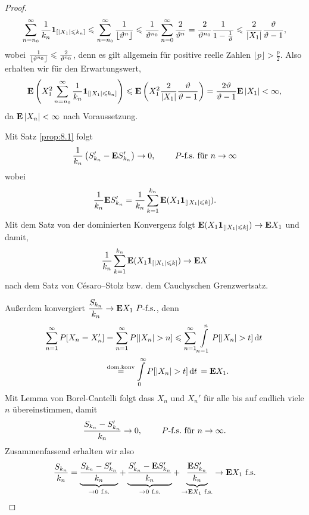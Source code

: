 \begin{proof}
\begin{align*}
\sum\limits_{n=n_0}^\infty \frac{1}{k_n}\mathbf{1}_{[\left|X_1\right|\leqslant k_n]}
\leqslant
\sum\limits_{n=n_0}^\infty \frac{1}{\lfloor\vartheta^n\rfloor}
\leqslant \frac{1}{\vartheta^{n_0}}
\sum\limits_{n=0}^\infty \frac{2}{\vartheta^n}
= \frac{2}{\vartheta^{n_0}}\frac{1}{1-\frac{1}{\vartheta}}
\leqslant \frac{2}{\left|X_1\right|}\frac{\vartheta}{\vartheta-1},
\end{align*}
wobei $\frac{1}{\lfloor\vartheta^{n_0}\rfloor} \leqslant \frac{2}{\vartheta^{n_0}}$, denn es gilt
allgemein für positive reelle Zahlen  $\lfloor p\rfloor  > \frac{p}{2}$. Also
erhalten wir für den Erwartungswert,
\begin{align*}
\textbf{E}\left(X_1^2 \sum\limits_{n=n_0}^\infty \frac{1}{k_n}
\mathbf{1}_{[\left|X_1\right|\leqslant k_n]}\right)
\leqslant \textbf{E} \left(X_1^2 \frac{2}{\left|X_1\right|}\frac{\vartheta}{\vartheta-1}\right)
= \frac{2\vartheta}{\vartheta-1}\textbf{E} \left|X_1\right| < \infty,
\end{align*}
da $\textbf{E}\left|X_n\right|<\infty$ nach Voraussetzung.

Mit Satz \ref{prop:8.1} folgt
\begin{align*}
\frac{1}{k_n}\left(S_{k_n}'-\textbf{E} S_{k_n}'\right) \to 0,\qquad \ P\text{-f.s.}\text{ für }
n\to\infty
\end{align*}
wobei
\begin{align*}
\frac{1}{k_n}\textbf{E} S_{k_n}' = \frac{1}{k_n}\sum\limits_{k=1}^{k_n} \textbf{E} (X_1
\mathbf{1}_{[\left|X_1\right|\leqslant k]}).
\end{align*}
Mit dem Satz von der dominierten Konvergenz folgt $\textbf{E} (X_1
\mathbf{1}_{[\left|X_1\right|\leqslant k]})\to \textbf{E} X_1$ und damit,
\begin{align*}
\frac{1}{k_n}\sum\limits_{k=1}^{k_n} \textbf{E} (X_1
\mathbf{1}_{[\left|X_1\right|\leqslant k]})\to \textbf{E} X
\end{align*}
nach dem Satz von Césaro–Stolz bzw. dem Cauchyschen Grenzwertsatz.

Außerdem konvergiert $\dfrac{S_{k_n}}{k_n}\to\textbf{E} X_1\ P\text{-f.s.}$, denn
\begin{align*}
\sum\limits_{n=1}^\infty P[X_n=X_n'] &= 
\sum\limits_{n=1}^\infty P[\abs{X_n}>n] 
\le
\sum\limits_{n=1}^\infty \int\limits_{n-1}^n P[\abs{X_n}>t]\dt\\
&\overset{\text{dom.konv}}{=}
\int\limits_{0}^\infty P[\abs{X_n}>t]\dt
=
\E X_1.
\end{align*}
Mit Lemma von Borel-Cantelli folgt dass $X_n$ und $X_n'$ für alle bis auf
endlich viele $n$ übereinstimmen, damit
\begin{align*}
\frac{S_{k_n}-S_{k_n}'}{k_n}\to 0,\qquad \ P\text{-f.s.} \text{ für }n\to\infty.
\end{align*}
Zusammenfassend erhalten wir also
\begin{align*}
\frac{S_{k_n}}{k_n}
=
\underbrace{\frac{S_{k_n}-S_{k_n}'}{k_n}}_{\to0\ \text{f.s.}}
+
\underbrace{\frac{S_{k_n}'-\textbf{E} S_{k_n}'}{k_n}}_{\to 0\ \text{f.s.}}
+
\underbrace{\frac{\textbf{E} S_{k_n}'}{k_n}}_{\to\textbf{E} X_1\ \text{f.s.}} \to \textbf{E} X_1\ \text{f.s.}
\end{align*}


\end{proof}
